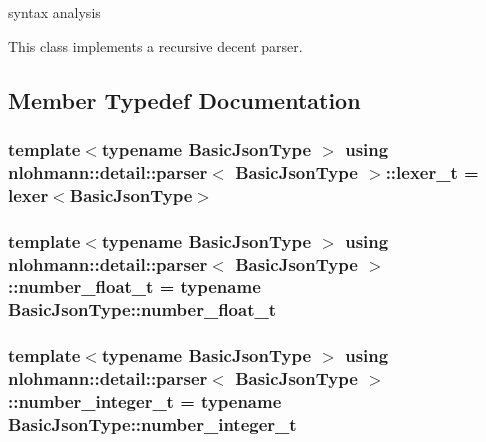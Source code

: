 syntax analysis 

This class implements a recursive decent parser. 

\subsection{Member Typedef Documentation}
\subsubsection[{\texorpdfstring{lexer\+\_\+t}{lexer_t}}]{\setlength{\rightskip}{0pt plus 5cm}template$<$typename Basic\+Json\+Type $>$ using {\bf nlohmann\+::detail\+::parser}$<$ Basic\+Json\+Type $>$\+::{\bf lexer\+\_\+t} =  {\bf lexer}$<$Basic\+Json\+Type$>$\hspace{0.3cm}{\ttfamily [private]}}\hypertarget{classnlohmann_1_1detail_1_1parser_a16030c5af158a94d1c799f82ff3a0147}{}\label{classnlohmann_1_1detail_1_1parser_a16030c5af158a94d1c799f82ff3a0147}
\subsubsection[{\texorpdfstring{number\+\_\+float\+\_\+t}{number_float_t}}]{\setlength{\rightskip}{0pt plus 5cm}template$<$typename Basic\+Json\+Type $>$ using {\bf nlohmann\+::detail\+::parser}$<$ Basic\+Json\+Type $>$\+::{\bf number\+\_\+float\+\_\+t} =  typename Basic\+Json\+Type\+::number\+\_\+float\+\_\+t\hspace{0.3cm}{\ttfamily [private]}}\hypertarget{classnlohmann_1_1detail_1_1parser_a8ca8e734da0632c2731fc3b9547dcf28}{}\label{classnlohmann_1_1detail_1_1parser_a8ca8e734da0632c2731fc3b9547dcf28}
\subsubsection[{\texorpdfstring{number\+\_\+integer\+\_\+t}{number_integer_t}}]{\setlength{\rightskip}{0pt plus 5cm}template$<$typename Basic\+Json\+Type $>$ using {\bf nlohmann\+::detail\+::parser}$<$ Basic\+Json\+Type $>$\+::{\bf number\+\_\+integer\+\_\+t} =  typename Basic\+Json\+Type\+::number\+\_\+integer\+\_\+t\hspace{0.3cm}{\ttfamily [private]}}\hypertarget{classnlohmann_1_1detail_1_1parser_aa0362897269e0a7e50ae07be05f42d8e}{}\label{classnlohmann_1_1detail_1_1parser_aa0362897269e0a7e50ae07be05f42d8e}
